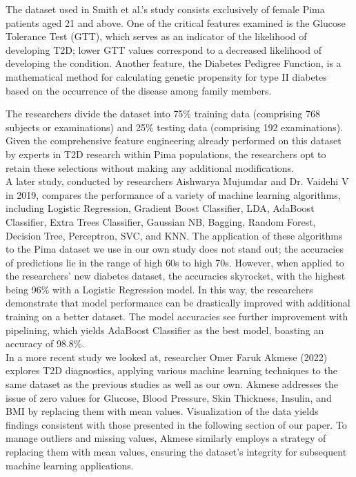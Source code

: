 \documentclass[journal]{IEEEtran}
\begin{document}
The dataset used in Smith et al.'s study consists exclusively of female Pima patients aged 21 and above. One of the critical features examined is the Glucose Tolerance Test (GTT), which serves as an indicator of the likelihood of developing T2D; lower GTT values correspond to a decreased likelihood of developing the condition. Another feature, the Diabetes Pedigree Function, is a mathematical method for calculating genetic propensity for type II diabetes based on the occurrence of the disease among family members.

The researchers divide the dataset into 75\% training data (comprising 768 subjects or examinations) and 25\% testing data (comprising 192 examinations). Given the comprehensive feature engineering already performed on this dataset by experts in T2D research within Pima populations, the researchers opt to retain these selections without making any additional modifications.\\

A later study, conducted by researchers Aishwarya Mujumdar and Dr. Vaidehi V in 2019, compares the performance of a variety of machine learning algorithms, including Logistic Regression, Gradient Boost Classifier, LDA, AdaBoost Classifier, Extra Trees Classifier, Gaussian NB, Bagging, Random Forest, Decision Tree, Perceptron, SVC, and KNN. The application of these algorithms to the Pima dataset we use in our own study does not stand out; the accuracies of predictions lie in the range of high 60s to high 70s. However, when applied to the researchers' new diabetes dataset, the accuracies skyrocket, with the highest being 96\% with a Logistic Regression model. In this way, the researchers demonstrate that model performance can be drastically improved with additional training on a better dataset. The model accuracies see further improvement with pipelining, which yields AdaBoost Classifier as the best model, boasting an accuracy of 98.8\%.\\

In a more recent study we looked at, researcher Omer Faruk Akmese (2022) explores T2D diagnostics, applying various machine learning techniques to the same dataset as the previous studies as well as our own. Akmese addresses the issue of zero values for Glucose, Blood Pressure, Skin Thickness, Insulin, and BMI by replacing them with mean values. Visualization of the data yields findings consistent with those presented in the following section of our paper. To manage outliers and missing values, Akmese similarly employs a strategy of replacing them with mean values, ensuring the dataset's integrity for subsequent machine learning applications.\\
\end{document}
